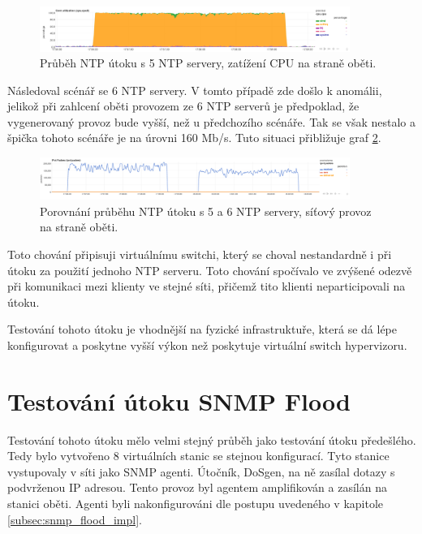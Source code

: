 \begin{figure} [h]
	\centering
	\includegraphics[width=0.9\textwidth]
	{obrazky/grafy/graph_ntp_cpu_5ampl.png}
	\caption{Průběh NTP útoku s 5 NTP servery, zatížení CPU na straně oběti.}
	\label{fig:graph_cpu_traffic_5ampl}
\end{figure}

Následoval scénář se 6 NTP servery. V tomto případě zde došlo k anomálii, jelikož při zahlcení oběti provozem ze 6 NTP serverů je předpoklad, že vygenerovaný provoz bude vyšší, než u předchozího scénáře. Tak se však nestalo a špička tohoto scénáře je na úrovni 160 Mb/s.
Tuto situaci přibližuje graf \ref{fig:graph_ntp_traffic_5ampl_vs6ampl}.

\begin{figure} [h]
	\centering
	\includegraphics[width=0.9\textwidth]
	{obrazky/grafy/graph_ntp_traffic_5ampl_vs6ampl.png}
	\caption{Porovnání průběhu NTP útoku s 5 a 6 NTP servery, síťový provoz na straně oběti.}
	\label{fig:graph_ntp_traffic_5ampl_vs6ampl}
\end{figure}

Toto chování připisuji virtuálnímu switchi, který se choval nestandardně i při útoku za použití jednoho NTP serveru. Toto chování spočívalo ve zvýšené odezvě při komunikaci mezi klienty ve stejné síti, přičemž tito klienti neparticipovali na útoku.

Testování tohoto útoku je vhodnější na fyzické infrastruktuře, která se dá lépe konfigurovat a poskytne vyšší výkon než poskytuje virtuální switch hypervizoru.

\section{Testování útoku SNMP Flood}
Testování tohoto útoku mělo velmi stejný průběh jako testování útoku předešlého. Tedy bylo vytvořeno 8 virtuálních stanic se stejnou konfigurací. Tyto stanice vystupovaly v síti jako SNMP agenti. Útočník, DoSgen, na ně zasílal dotazy s podvrženou IP adresou. Tento provoz byl agentem amplifikován a zasílán na stanici oběti. Agenti byli nakonfigurováni dle postupu uvedeného v kapitole \ref{subsec:snmp_flood_impl}.

